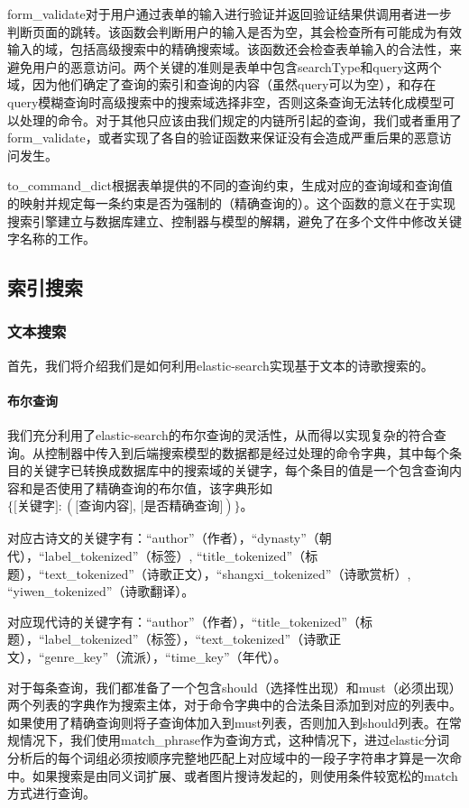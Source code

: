 \documentclass[a4paper, 10pt]{article}
\begin{document}
form\_validate对于用户通过表单的输入进行验证并返回验证结果供调用者进一步判断页面的跳转。该函数会判断用户的输入是否为空，其会检查所有可能成为有效输入的域，包括高级搜索中的精确搜索域。该函数还会检查表单输入的合法性，来避免用户的恶意访问。两个关键的准则是表单中包含searchType和query这两个域，因为他们确定了查询的索引和查询的内容（虽然query可以为空），和存在query模糊查询时高级搜索中的搜索域选择非空，否则这条查询无法转化成模型可以处理的命令。对于其他只应该由我们规定的内链所引起的查询，我们或者重用了form\_validate，或者实现了各自的验证函数来保证没有会造成严重后果的恶意访问发生。

to\_command\_dict根据表单提供的不同的查询约束，生成对应的查询域和查询值的映射并规定每一条约束是否为强制的（精确查询的）。这个函数的意义在于实现搜索引擎建立与数据库建立、控制器与模型的解耦，避免了在多个文件中修改关键字名称的工作。

\subsection{索引搜索}

\subsubsection{文本搜索}
首先，我们将介绍我们是如何利用elastic-search实现基于文本的诗歌搜索的。

\paragraph*{布尔查询} 我们充分利用了elastic-search的布尔查询的灵活性，从而得以实现复杂的符合查询。从控制器中传入到后端搜索模型的数据都是经过处理的命令字典，其中每个条目的关键字已转换成数据库中的搜索域的关键字，每个条目的值是一个包含查询内容和是否使用了精确查询的布尔值，该字典形如$\{ \text{[关键字]}: (\text{[查询内容], [是否精确查询]}) \}$。

对应古诗文的关键字有：“author”（作者），“dynasty”（朝代），“label\_tokenized”（标签）, 
“title\_tokenized”（标题），“text\_tokenized”（诗歌正文），“shangxi\_tokenized”（诗歌赏析）, “yiwen\_tokenized”（诗歌翻译）。

对应现代诗的关键字有：“author”（作者），“title\_tokenized”（标题），“label\_tokenized”（标签），“text\_tokenized”（诗歌正文），“genre\_key”（流派），“time\_key”（年代）。

对于每条查询，我们都准备了一个包含should（选择性出现）和must（必须出现）两个列表的字典作为搜索主体，对于命令字典中的合法条目添加到对应的列表中。如果使用了精确查询则将子查询体加入到must列表，否则加入到should列表。在常规情况下，我们使用match\_phrase作为查询方式，这种情况下，进过elastic分词分析后的每个词组必须按顺序完整地匹配上对应域中的一段子字符串才算是一次命中。如果搜索是由同义词扩展、或者图片搜诗发起的，则使用条件较宽松的match方式进行查询。
\end{document}
